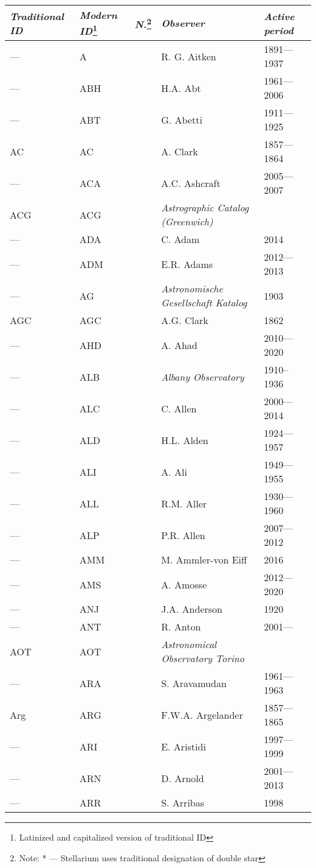 \begin{longtable}{l|l|c|p{59mm}|l}\toprule
\emph{Traditional ID} & \emph{Modern ID}\footnote{Latinized and capitalized version of traditional ID} & \emph{N.}\footnote{Note: * --- Stellarium uses traditional designation of double star} & \emph{Observer} & \emph{Active period} \\\midrule
--- & A   	&   & R. G. Aitken & 1891---1937 \\
--- & ABH &   & H.A. Abt & 1961---2006 \\
--- & ABT &   & G. Abetti & 1911---1925 \\
AC	& AC  &   & A. Clark & 1857---1864 \\
---	& ACA &   & A.C. Ashcraft & 2005---2007 \\
ACG	& ACG &   & \emph{Astrographic Catalog (Greenwich)} & \\
--- & ADA &   & C. Adam & 2014 \\
--- & ADM &   & E.R. Adams & 2012---2013\\
--- & AG  &   & \emph{Astronomische Gesellschaft Katalog} & 1903 \\
AGC & AGC &   & A.G. Clark & 1862 \\
--- & AHD &   & A. Ahad & 2010---2020 \\
--- & ALB &   & \emph{Albany Observatory} & 1910--1936 \\
--- & ALC &   & C. Allen & 2000---2014 \\
--- & ALD &   & H.L. Alden & 1924---1957 \\
--- & ALI &   & A. Ali & 1949---1955 \\
--- & ALL &   & R.M. Aller & 1930---1960 \\
--- & ALP &   & P.R. Allen & 2007---2012 \\
--- & AMM &   & M. Ammler-von Eiff & 2016 \\
--- & AMS &   & A. Amosse & 2012---2020 \\
--- & ANJ &   & J.A. Anderson & 1920 \\
--- & ANT &   & R. Anton & 2001--- \\
AOT & AOT &   & \emph{Astronomical Observatory Torino} & \\
--- & ARA &   & S. Aravamudan & 1961---1963 \\
Arg	& ARG &   & F.W.A. Argelander & 1857---1865 \\
--- & ARI &   & E. Aristidi & 1997---1999 \\
--- & ARN &   & D. Arnold & 2001---2013 \\
--- & ARR &   & S. Arribas & 1998 \\

\end{longtable}
